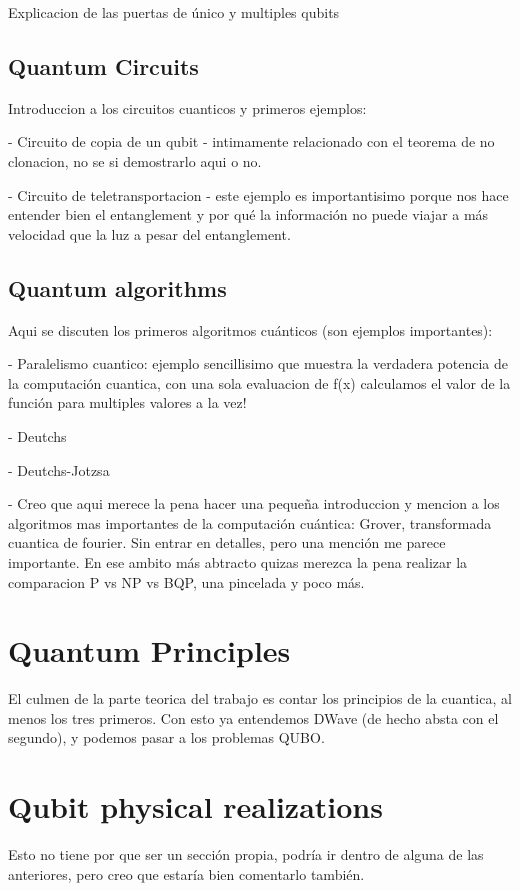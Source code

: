Explicacion de las puertas de único y multiples qubits

\subsection{Quantum Circuits}

Introduccion a los circuitos cuanticos y primeros ejemplos:

- Circuito de copia de un qubit - intimamente relacionado con el teorema de no clonacion, no se si demostrarlo aqui o no.

- Circuito de teletransportacion - este ejemplo es importantisimo porque nos hace entender bien el entanglement y por qué la información no puede viajar a más velocidad que la luz a pesar del entanglement.

\subsection{Quantum algorithms}

Aqui se discuten los primeros algoritmos cuánticos (son ejemplos importantes):

- Paralelismo cuantico: ejemplo sencillisimo que muestra la verdadera potencia de la computación cuantica, con una sola evaluacion de f(x) calculamos el valor de la función para multiples valores a la vez!

- Deutchs

- Deutchs-Jotzsa

- Creo que aqui merece la pena hacer una pequeña introduccion y mencion a los algoritmos mas importantes de la computación cuántica: Grover, transformada cuantica de fourier. Sin entrar en detalles, pero una mención me parece importante. En ese ambito más abtracto quizas merezca la pena realizar la comparacion P vs NP vs BQP, una pincelada y poco más.


\section{Quantum Principles}

El culmen de la parte teorica del trabajo es contar los principios de la cuantica, al menos los tres primeros. Con esto ya entendemos DWave (de hecho absta con el segundo), y podemos pasar a los problemas QUBO.

\section{Qubit physical realizations}

Esto no tiene por que ser un sección propia, podría ir dentro de alguna de las anteriores, pero creo que estaría bien comentarlo también.


